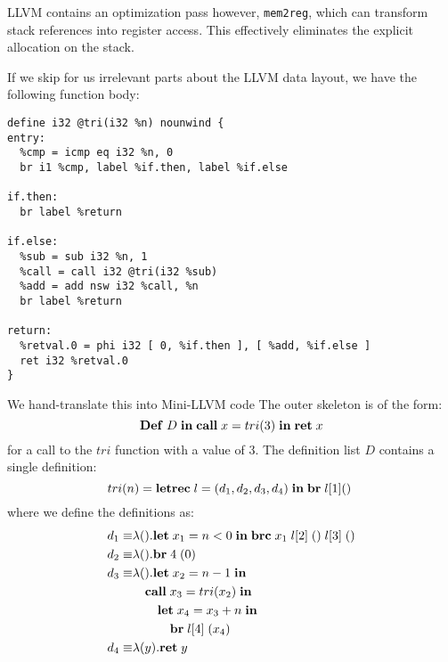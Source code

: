 \documentclass[a4paper, oneside, 10pt, draft]{memoir}
\begin{document}
LLVM contains an optimization pass however, \texttt{mem2reg}, which
can transform stack references into register access. This effectively
eliminates the explicit allocation on the stack.

If we skip for us irrelevant parts about the LLVM data layout, we have
the following function body:
\begin{verbatim}
define i32 @tri(i32 %n) nounwind {
entry:
  %cmp = icmp eq i32 %n, 0
  br i1 %cmp, label %if.then, label %if.else

if.then:
  br label %return

if.else:
  %sub = sub i32 %n, 1
  %call = call i32 @tri(i32 %sub)
  %add = add nsw i32 %call, %n
  br label %return

return:
  %retval.0 = phi i32 [ 0, %if.then ], [ %add, %if.else ]
  ret i32 %retval.0
}
\end{verbatim}

We hand-translate this into Mini-LLVM code The outer skeleton is of
the form:
\begin{equation*}
  \mathbf{Def} \; D \; \mathbf{in} \; \mathbf{call} \; x = tri (3)\; \mathbf{in} \; \mathbf{ret} \; x
\end{equation*}
for a call to the $tri$ function with a value of 3. The definition
list $D$ contains a single definition:
\begin{equation*}
  tri(n) = \mathbf{letrec} \; l = (d_1, d_2, d_3, d_4) \; \mathbf{in} \; \mathbf{br} \; l[1]{()} \; \end{equation*}
where we define the definitions as:
\begin{align*}
  d_1 \equiv &\lambda().\mathbf{let} \; x_1 = n < 0 \; \mathbf{in} \; \mathbf{brc} \; x_1 \; l[2] \; () \; l[3] \; ()\\
  d_2 \equiv &\lambda().\mathbf{br} \; 4 \; (0)\\
  d_3 \equiv &\lambda().\mathbf{let} \; x_2 = n - 1 \; \mathbf{in} \; \\ & \quad \mathbf{call} \; x_3 = tri (x_2)\; \mathbf{in} \; \\ & \qquad \mathbf{let} \; x_4 = x_3 + n \; \mathbf{in} \; \\ & \qquad \quad \mathbf{br} \; l[4] \; (x_4)\\
  d_4 \equiv &\lambda(y).\mathbf{ret} \; y
\end{align*}
\end{document}
